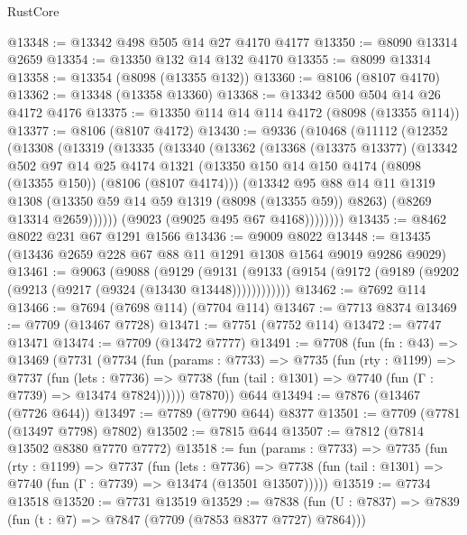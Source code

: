 \begin{lexlean}{RustCore}
\begin{coremodule}
@13348 := @13342 @498 @505 @14 @27 @4170 @4177
@13350 := @8090 @13314 @2659
@13354 := @13350 @132 @14 @132 @4170
@13355 := @8099 @13314
@13358 := @13354 (@8098 (@13355 @132))
@13360 := @8106 (@8107 @4170)
@13362 := @13348 (@13358 @13360)
@13368 := @13342 @500 @504 @14 @26 @4172 @4176
@13375 := @13350 @114 @14 @114 @4172 (@8098 (@13355 @114))
@13377 := @8106 (@8107 @4172)
@13430 := @9336
    (@10468
      (@11112
        (@12352
          (@13308
            (@13319
              (@13335
                (@13340
                  (@13362
                    (@13368
                      (@13375 @13377)
                      (@13342
                        @502
                        @97
                        @14
                        @25
                        @4174
                        @1321
                        (@13350 @150 @14 @150 @4174 (@8098 (@13355 @150)) (@8106 (@8107 @4174)))
                        (@13342
                          @95
                          @88
                          @14
                          @11
                          @1319
                          @1308
                          (@13350 @59 @14 @59 @1319 (@8098 (@13355 @59)) @8263)
                          (@8269 @13314 @2659))))))
                (@9023 (@9025 @495 @67 @4168))))))))
@13435 := @8462 @8022 @231 @67 @1291 @1566
@13436 := @9009 @8022
@13448 := @13435 (@13436 @2659 @228 @67 @88 @11 @1291 @1308 @1564 @9019 @9286 @9029)
@13461 := @9063
    (@9088
      (@9129
        (@9131 (@9133 (@9154 (@9172 (@9189 (@9202 (@9213 (@9217 (@9324 (@13430 @13448))))))))))))
@13462 := @7692 @114
@13466 := @7694 (@7698 @114) (@7704 @114)
@13467 := @7713 @8374
@13469 := @7709 (@13467 @7728)
@13471 := @7751 (@7752 @114)
@13472 := @7747 @13471
@13474 := @7709 (@13472 @7777)
@13491 := @7708
    (fun (fn : @43) =>
    @13469
      (@7731
        (@7734
          (fun (params : @7733) =>
          @7735
            (fun (rty : @1199) =>
            @7737
              (fun (lets : @7736) =>
              @7738 (fun (tail : @1301) => @7740 (fun (Γ : @7739) => @13474 @7824))))))
        @7870))
    @644
@13494 := @7876 (@13467 (@7726 @644))
@13497 := @7789 (@7790 @644) @8377
@13501 := @7709 (@7781 (@13497 @7798) @7802)
@13502 := @7815 @644
@13507 := @7812 (@7814 @13502 @8380 @7770 @7772)
@13518 := fun (params : @7733) =>
  @7735
    (fun (rty : @1199) =>
    @7737
      (fun (lets : @7736) =>
      @7738 (fun (tail : @1301) => @7740 (fun (Γ : @7739) => @13474 (@13501 @13507)))))
@13519 := @7734 @13518
@13520 := @7731 @13519
@13529 := @7838 (fun (U : @7837) => @7839 (fun (t : @7) => @7847 (@7709 (@7853 @8377 @7727) @7864)))

\end{coremodule}
\end{lexlean}

